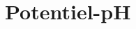 \documentclass[../main/main.tex]{subfiles}
\begin{document}
\setcounter{chapter}{6}

\chapter{Potentiel-pH}
\end{document}
